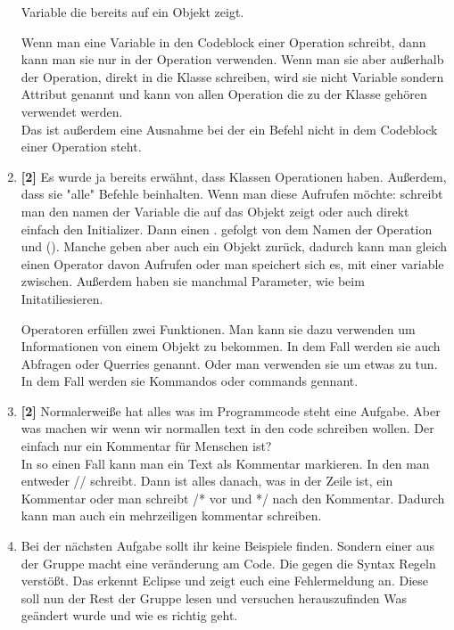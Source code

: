 \begin{enumerate}
    Variable die bereits auf ein Objekt zeigt.
    \begin{Infobox}[Attribute]
        Wenn man eine Variable in den Codeblock einer Operation schreibt, dann kann man sie nur in der Operation verwenden.
        Wenn man sie aber außerhalb der Operation, direkt in die Klasse schreiben, wird sie nicht Variable sondern Attribut genannt und kann von allen Operation die zu der Klasse gehören verwendet werden.\\
        Das ist außerdem eine Ausnahme bei der ein Befehl nicht in dem Codeblock einer Operation steht.
    \end{Infobox}
    \item \textbf{[2]} Es wurde ja bereits erwähnt, dass Klassen Operationen haben. Außerdem, dass sie "alle" Befehle beinhalten. Wenn man diese Aufrufen möchte: schreibt man den namen der Variable die auf das Objekt zeigt oder auch direkt einfach den Initializer. Dann einen . gefolgt von dem Namen der Operation und (). Manche geben aber auch ein Objekt zurück, dadurch kann man gleich einen Operator davon Aufrufen oder man speichert sich es, mit einer variable zwischen. Außerdem haben sie manchmal Parameter, wie beim Initatiliesieren.
    \begin{Infobox}[Operatoren]
        Operatoren erfüllen zwei Funktionen. Man kann sie dazu verwenden um Informationen von einem Objekt zu bekommen. In dem Fall werden sie auch Abfragen oder Querries genannt.
        Oder man verwenden sie um etwas zu tun. In dem Fall werden sie Kommandos oder commands gennant.
    \end{Infobox}
    \item \textbf{[2]} Normalerweiße hat alles was im Programmcode steht eine Aufgabe. Aber was machen wir wenn wir normallen text in den code schreiben wollen. Der einfach nur ein Kommentar für Menschen ist?\\
    In so einen Fall kann man ein Text als Kommentar markieren. In den man entweder // schreibt. Dann ist alles danach, was in der Zeile ist, ein Kommentar oder man schreibt /* vor und */ nach den Kommentar. Dadurch kann man auch ein mehrzeiligen kommentar schreiben.
    \item Bei der nächsten Aufgabe sollt ihr keine Beispiele finden. Sondern einer aus der Gruppe macht eine veränderung am Code. Die gegen die Syntax Regeln verstößt. Das erkennt Eclipse und zeigt euch eine Fehlermeldung an. Diese soll nun der Rest der Gruppe lesen und versuchen herauszufinden Was geändert wurde und wie es richtig geht.\\

\end{enumerate}
